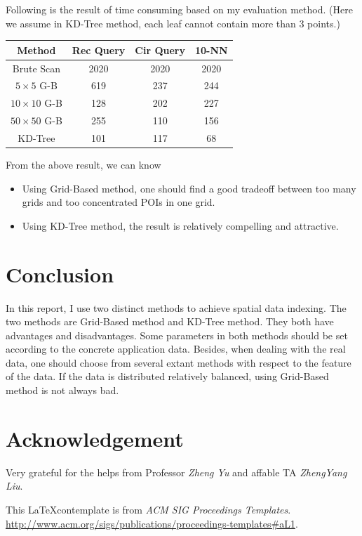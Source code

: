 \documentclass{acm_proc_article-sp}
\begin{document}
Following is the result of time consuming based on my evaluation method. (Here we assume in KD-Tree method, each leaf cannot contain more than 3 points.)

\begin{center}
\begin{tabular}{|c||c|c|c|}
\hline
\textbf{Method} & \textbf{Rec Query} & \textbf{Cir Query} & \textbf{10-NN} \\
\hline
Brute Scan & 2020 & 2020 & 2020 \\
\hline
$5\times 5$ G-B & 619 & 237 & 244 \\
\hline
$10\times 10$ G-B & 128 & 202 & 227 \\
\hline
$50\times 50$ G-B & 255 & 110 & 156 \\
\hline
KD-Tree & 101 & 117 & 68 \\
\hline
\end{tabular}
\end{center}

From the above result, we can know
\begin{itemize}
\item Using Grid-Based method, one should find a good tradeoff between too many grids and too concentrated POIs in one grid.
\item Using KD-Tree method, the result is relatively compelling and attractive.
\end{itemize}

\section{Conclusion}

In this report, I use two distinct methods to achieve spatial data indexing. The two methods are Grid-Based method and KD-Tree method. They both have advantages and disadvantages. Some parameters in both methods should be set according to the concrete application data. Besides, when dealing with the real data, one should choose from several extant methods with respect to the feature of the data. If the data is distributed relatively balanced, using Grid-Based method is not always bad.

\section{Acknowledgement}

Very grateful for the helps from Professor \textit{Zheng Yu} and affable TA \textit{ZhengYang Liu}.

This \LaTeX contemplate is from \textit{ACM SIG Proceedings Templates}. \href{http://www.acm.org/sigs/publications/proceedings-templates\#aL1}{http://www.acm.org/sigs/publications/proceedings-templates\#aL1}.
\end{document}
